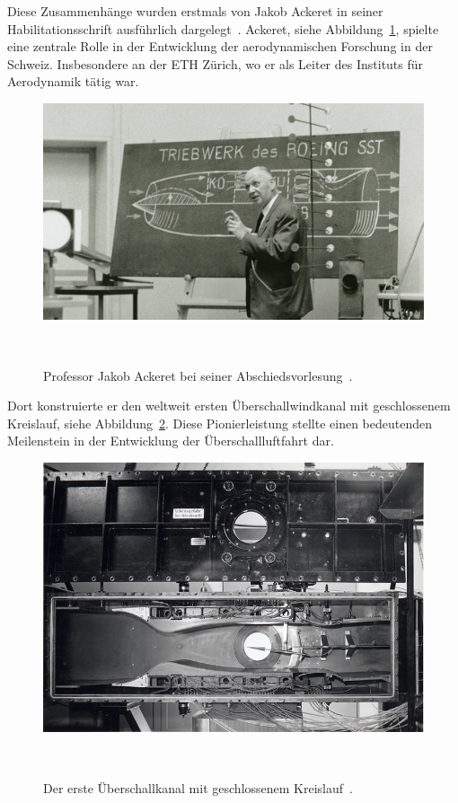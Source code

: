 Diese Zusammenhänge wurden erstmals von Jakob Ackeret in 
%
seiner Habilitationsschrift ausführlich 
dargelegt~\cite{Ackeret1928}.
Ackeret, siehe Abbildung~\ref{fig:ackeret}, 
spielte eine zentrale Rolle in der Entwicklung 
der aerodynamischen Forschung in der Schweiz. 
Insbesondere an der ETH Zürich, wo er als Leiter 
des Instituts für Aerodynamik tätig war.
%
\begin{figure}
    \centering
    \includegraphics[width=\textwidth]{papers/ueberschall/figures/Jakob_Ackeret_1967.jpg}
    \caption{Professor Jakob Ackeret bei seiner Abschiedsvorlesung~\cite{AckeretFoto1967}.}
    ~\label{fig:ackeret}
\end{figure}
Dort konstruierte er den weltweit ersten 
Überschallwindkanal mit geschlossenem Kreislauf, 
siehe Abbildung~\ref{fig:windkanal}.
Diese Pionierleistung stellte einen bedeutenden 
Meilenstein in der Entwicklung der Überschallluftfahrt dar.
%
\begin{figure}
    \centering
    \includegraphics[width=\textwidth]{papers/ueberschall/figures/Windkanal.jpg}
    \caption{Der erste Überschallkanal mit geschlossenem Kreislauf~\cite{ETHeritage2020}.}
    ~\label{fig:windkanal}
\end{figure}

